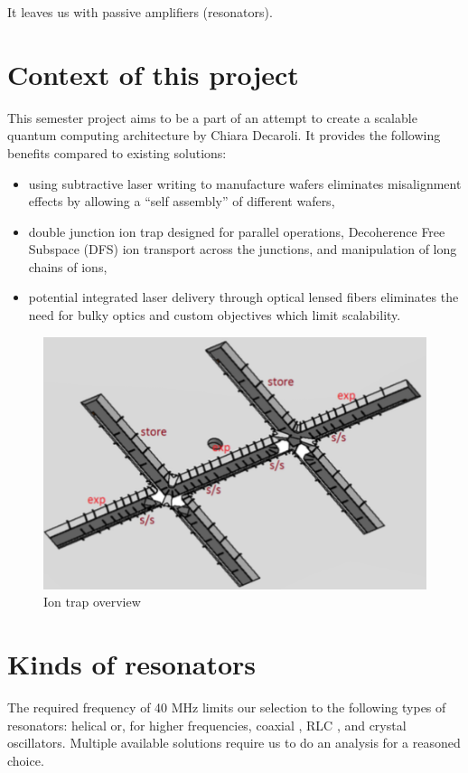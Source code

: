 It leaves us with passive amplifiers (resonators).
\section{Context of this project}
\label{sec:context}
This semester project aims to be a part of an attempt to create a scalable quantum computing architecture by Chiara Decaroli. It provides the following benefits compared to existing solutions:
\begin{itemize}
	\item using subtractive laser writing to manufacture wafers eliminates misalignment effects by allowing a ``self assembly'' of different wafers,
	\item double junction ion trap designed for parallel operations, Decoherence Free Subspace (DFS) ion transport across the junctions, and manipulation of long chains of ions,
	\item potential integrated laser delivery through optical lensed fibers eliminates the need for bulky optics and custom objectives which limit scalability.
\end{itemize}

\begin{figure}[h]
	\centering
	\includegraphics[width=.92\textwidth]{images/trap}
	\caption{Ion trap overview}
\end{figure}

\section{Kinds of resonators}
\label{sec:kinds_resonators}
The required frequency of 40 MHz limits our selection to the following types of resonators: helical \cite{Gulde2017, Johnson2016, VanRynbach2016, Kassa2016, Kassa2017} or, for higher frequencies, coaxial \cite{Karin2012}, RLC \cite{Gandolfi2010, Kumph2015, Greene2016}, and crystal oscillators. Multiple available solutions require us to do an analysis for a reasoned choice.
